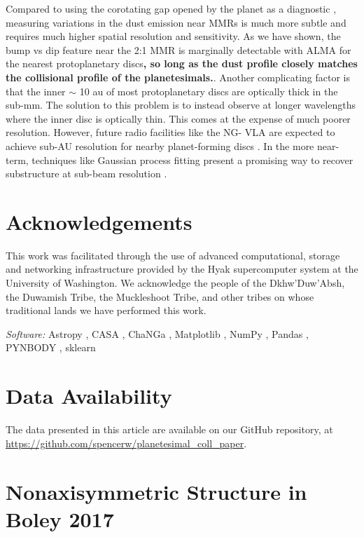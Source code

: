 \documentclass[fleqn,usenatbib]{mnras}
\begin{document}
Compared to using the corotating gap opened by the planet as a diagnostic \citep{2013ApJ...777L..31D, 2016ApJ...820...29D}, measuring 
variations in the dust emission near MMRs is much more subtle and requires much higher spatial resolution and sensitivity. As we have shown, the 
bump vs dip feature near the 2:1 MMR is marginally detectable with ALMA for the nearest protoplanetary discs\textbf{, so long as the dust profile closely matches the collisional profile of the planetesimals.}. Another complicating factor is that 
the inner $\sim$ 10 au of most protoplanetary discs are optically thick in the sub-mm. The solution to this problem is to instead observe at longer 
wavelengths where the inner disc is optically thin. This comes at the expense of much poorer resolution. However, future radio facilities like the NG-
VLA are expected to achieve sub-AU resolution for nearby planet-forming discs \citep{2018ASPC..517..147R}. In the more near-term, techniques 
like Gaussian process fitting present a promising way to recover substructure at sub-beam resolution \citep{2020arXiv200507709J}.

\section*{Acknowledgements}
This work was facilitated through the use of advanced computational, storage and networking infrastructure provided by the Hyak supercomputer system at the 
University of Washington. We acknowledge the people of the Dkhw’Duw’Absh, the Duwamish Tribe, the Muckleshoot Tribe, and other tribes on whose traditional 
lands we have performed this work.

\textit{Software:} Astropy \citep{2013A&A...558A..33A}, {\sc CASA} \citep{2007ASPC..376..127M}, {\sc ChaNGa} \citep{2008IEEEpds...ChaNGa, 2015AphCom..2..1}, Matplotlib \citep{2007CSE.....9...90H}, NumPy \citep{2011CSE....13b..22V}, Pandas \citep{mckinney-proc-scipy-2010}, {\sc PYNBODY} \citep{2013ascl.soft05002P}, {\sc sklearn} \citep{scikit-learn}

\section*{Data Availability}
The data presented in this article are available on our GitHub repository, at \url{https://github.com/spencerw/planetesimal_coll_paper}.




\appendix
\section{Nonaxisymmetric Structure in Boley 2017}\label{sec:boley_plot}
\end{document}
